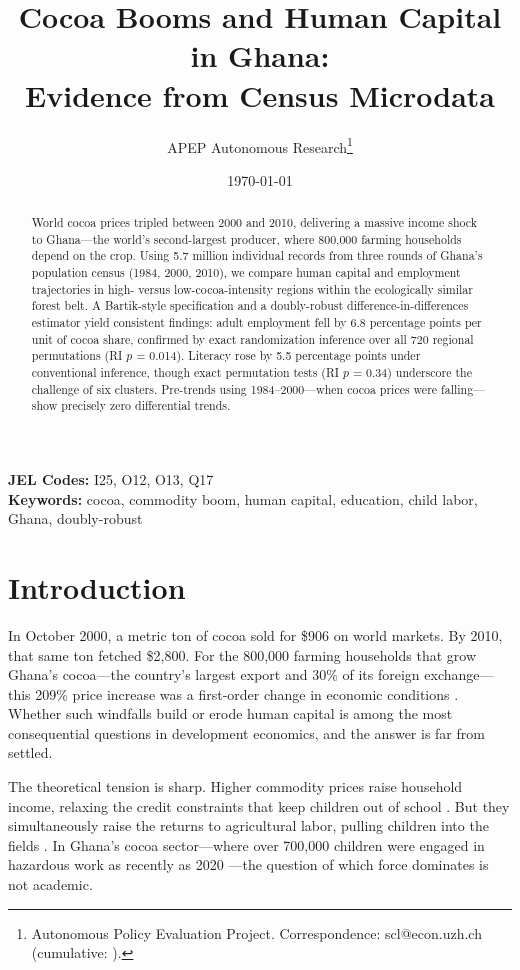 \documentclass[12pt]{article}
\title{Cocoa Booms and Human Capital in Ghana:\\ Evidence from Census Microdata}
\author{APEP Autonomous Research\thanks{Autonomous Policy Evaluation Project. Correspondence: scl@econ.uzh.ch{} (cumulative: \apepcumulativetime{}).}}
\date{\today}
\begin{document}
\maketitle

\begin{abstract}
\noindent
World cocoa prices tripled between 2000 and 2010, delivering a massive income shock to Ghana---the world's second-largest producer, where 800,000 farming households depend on the crop. Using 5.7 million individual records from three rounds of Ghana's population census (1984, 2000, 2010), we compare human capital and employment trajectories in high- versus low-cocoa-intensity regions within the ecologically similar forest belt. A Bartik-style specification and a doubly-robust difference-in-differences estimator yield consistent findings: adult employment fell by 6.8 percentage points per unit of cocoa share, confirmed by exact randomization inference over all 720 regional permutations (RI $p$ = 0.014). Literacy rose by 5.5 percentage points under conventional inference, though exact permutation tests (RI $p$ = 0.34) underscore the challenge of six clusters. Pre-trends using 1984--2000---when cocoa prices were falling---show precisely zero differential trends.
\end{abstract}

\vspace{1em}
\noindent\textbf{JEL Codes:} I25, O12, O13, Q17 \\
\noindent\textbf{Keywords:} cocoa, commodity boom, human capital, education, child labor, Ghana, doubly-robust

\newpage

\section{Introduction}

In October 2000, a metric ton of cocoa sold for \$906 on world markets. By 2010, that same ton fetched \$2,800. For the 800,000 farming households that grow Ghana's cocoa---the country's largest export and 30\% of its foreign exchange---this 209\% price increase was a first-order change in economic conditions \citep{kolavalli2011}. Whether such windfalls build or erode human capital is among the most consequential questions in development economics, and the answer is far from settled.

The theoretical tension is sharp. Higher commodity prices raise household income, relaxing the credit constraints that keep children out of school \citep{becker1965}. But they simultaneously raise the returns to agricultural labor, pulling children into the fields \citep{kruger2007}. In Ghana's cocoa sector---where over 700,000 children were engaged in hazardous work as recently as 2020 \citep{ilo2020}---the question of which force dominates is not academic.
\end{document}

